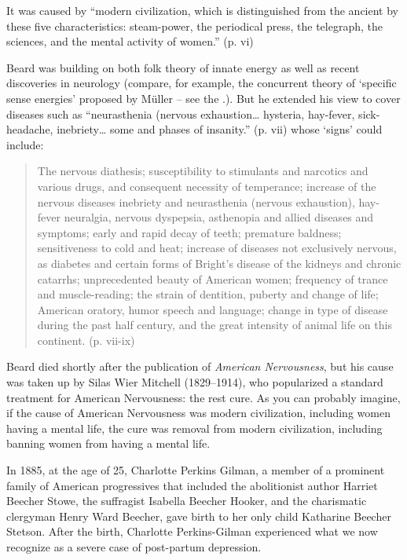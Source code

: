 \begin{refsection}
It was caused by “modern civilization, which is distinguished from the ancient by these five characteristics: steam-power, the periodical press, the telegraph, the sciences, and the mental activity of women.” (p. vi)

Beard was building on both folk theory of innate energy as well as recent discoveries in neurology (compare, for example, the concurrent theory of `specific sense energies' proposed by Müller – see the .). But he extended his view to cover diseases such as “neurasthenia (nervous exhaustion{\ldots} hysteria, hay-fever, sick-headache, inebriety{\ldots} some and phases of insanity.” (p. vii) whose `signs' could include:

\begin{quote}

The nervous diathesis; susceptibility to stimulants and narcotics and various drugs, and consequent necessity of temperance; increase of the nervous diseases inebriety and neurasthenia (nervous exhaustion), hay-fever neuralgia, nervous dyspepsia, asthenopia and allied diseases and symptoms; early and rapid decay of teeth; premature baldness; sensitiveness to cold and heat; increase of diseases not exclusively nervous, as diabetes and certain forms of Bright's disease of the kidneys and chronic catarrhs; unprecedented beauty of American women; frequency of trance and muscle-reading; the strain of dentition, puberty and change of life; American oratory, humor speech and language; change in type of disease during the past half century, and the great intensity of animal life on this continent. (p. vii-ix)
\end{quote}

Beard died shortly after the publication of \emph{American Nervousness}, but his cause was taken up by Silas Wier Mitchell (1829--1914), who popularized a standard treatment for American Nervousness: the rest cure. As you can probably imagine, if the cause of American Nervousness was modern civilization, including women having a mental life, the cure was removal from modern civilization, including banning women from having a mental life.

In 1885, at the age of 25, Charlotte Perkins Gilman, a member of a prominent family of American progressives that included the abolitionist author Harriet Beecher Stowe, the suffragist Isabella Beecher Hooker, and the charismatic clergyman Henry Ward Beecher, gave birth to her only child Katharine Beecher Stetson. After the birth, Charlotte Perkins-Gilman experienced what we now recognize as a severe case of post-partum depression.


\end{refsection}
